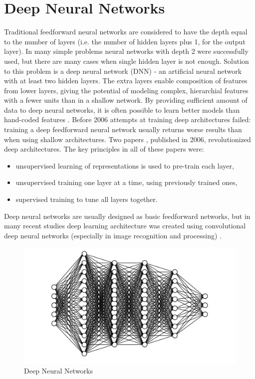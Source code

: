 \section{Deep Neural Networks}
        Traditional feedforward neural networks are considered to have the depth equal to the number of
    layers (i.e. the number of hidden layers plus 1, for the output layer). In many simple problems
    neural networks with depth 2 were successfully used, but there are many cases when single hidden
    layer is not enough. Solution to this problem is a deep neural network (DNN) - an artificial neural
    network with at least two hidden layers. The extra layers enable composition of features from
    lower layers, giving the potential of modeling complex, hierarchial features with a fewer units than
    in a shallow network. By providing sufficient amount of data to deep neural networks, it is often
    possible to learn better models than hand-coded features \cite{Krizhevsky:2012:ICD:2999134.2999257}.
    Before 2006 attempts at training deep architectures failed: training a deep feedforward neural network usually returns worse results than when using shallow architectures. Two papers \cite{Hinton:2006:FLA:1161603.1161605}\cite{Bengio:2006:GLT:2976456.2976476}, published in 2006, revolutionized deep architectures. The key principles in all
    of these papers were:
    \begin{itemize}
    \item unsupervised learning of representations is used to pre-train each layer,
    \item unsupervised training one layer at a time, using previously trained ones,
    \item supervised training to tune all layers together.
    \end{itemize}
    Deep neural networks are usually designed as basic feedforward networks, but in many recent
    studies deep learning architecture was created using convolutional deep neural networks (especially
    in image recognition and processing) \cite{DBLP:journals/corr/MnihKSGAWR13} \cite{mnih2015humanlevel}.
    
    \begin{figure}[H]
        \centering
        \includegraphics[scale=0.2]{images/dnn.png}
        \caption{Deep Neural Networks}
        \label{fig:34}
    \end{figure}
    
